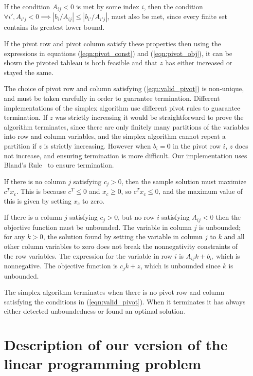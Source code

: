 \documentclass[11pt]{article} %
\begin{document}
If the condition $A_{ij} < 0$ is met by some index $i$, then the condition $\forall i', A_{i'j} < 0 \implies \left|b_i/A_{ij}\right| \le \left|b_{i'} / A_{i'j}\right|$, must also be met, since every finite set contains its greatest lower bound.

If the pivot row and pivot column satisfy these properties then using the expressions in equations (\ref{eqn:pivot_const}) and (\ref{eqn:pivot_obj}), it can be shown the pivoted tableau is both feasible and that $z$ has either increased or stayed the same.

The choice of pivot row and column satisfying (\ref{eqn:valid_pivot}) is non-unique, and must be taken carefully in order to guarantee termination. Different implementations of the simplex algorithm use different pivot rules to guarantee termination. If $z$ was strictly increasing it would be straightforward to prove the algorithm terminates, since there are only finitely many partitions of the variables into row and column variables, and the simplex algorithm cannot repeat a partition if $z$ is strictly increasing. However when $b_i = 0$ in the pivot row $i$, $z$ does not increase, and ensuring termination is more difficult. Our implementation uses Bland's Rule~\cite{Blands_rule} to ensure termination.

If there is no column $j$ satisfying $c_j > 0$, then the sample solution must maximize $c^Tx_c$. This is because $c^T \le 0$ and $x_c \ge 0$, so $c^Tx_c \le 0$, and the maximum value of this is given by setting $x_c$ to zero.

If there is a column $j$ satisfying $c_j > 0$, but no row $i$ satisfying $A_{ij} < 0$ then the objective function must be unbounded. The variable in column $j$ is unbounded; for any $k > 0$, the solution found by setting the variable in column $j$ to $k$ and all other column variables to zero does not break the nonnegativity constraints of the row variables. The expression for the variable in row $i$ is $A_{ij}k + b_i$, which is nonnegative. The objective function is $c_jk+z$, which is unbounded since $k$ is unbounded.

The simplex algorithm terminates when there is no pivot row and column satisfying the conditions in (\ref{eqn:valid_pivot}). When it terminates it has always either detected unboundedness or found an optimal solution.

\section{Description of our version of the linear programming problem}
\end{document}
